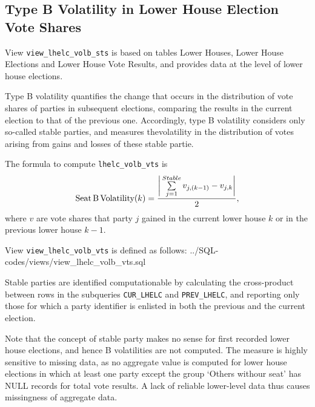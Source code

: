 \subsection{Type B Volatility in Lower House Election Vote Shares}\label{subsec_view_lhelc_volb_vts}

View \texttt{view\_lhelc\_volb\_sts} is based on tables Lower Houses, Lower House Elections and Lower House Vote Results, and provides data at the level of lower house elections.

Type B volatility quantifies the change that occurs in the distribution of vote shares of parties in subsequent elections, comparing the results in the current election to that of the previous one.
Accordingly, type B volatility considers only so-called stable parties, and measures thevolatility in the distribution of votes arising from gains and losses of these stable partie.

The formula to compute \texttt{lhelc\_volb\_vts} is
\begin{equation}
\mbox{Seat\,B\,Volatility}(k) = \frac{ \bigg| \sum\limits_{j=1}^{Stable} v_{j,(k-1)} - v_{j,k}\bigg| }{2},
\end{equation}
where $v$ are vote shares that party $j$ gained in the current lower house $k$ or in the previous lower house $k-1$.

View \texttt{view\_lhelc\_volb\_vts} is defined as follows:
%
{../SQL-codes/views/view_lhelc_volb_vts.sql}

Stable parties are identified computationable by calculating the cross-product between rows in the subqueries 
\texttt{CUR\_LHELC} and \texttt{PREV\_LHELC}, and reporting only those for which a party identifier is enlisted in both the previous and the current election.

Note that the concept of stable party makes no sense for first recorded lower house elections, and hence B volatilities are not computed. 
The measure is highly sensitive to missing data, as no aggregate value is computed for lower house  elections in which at least one party except the group `Others withour seat' has NULL records for total vote results. 
A lack of reliable lower-level data thus causes missingness of aggregate data. 
% 

